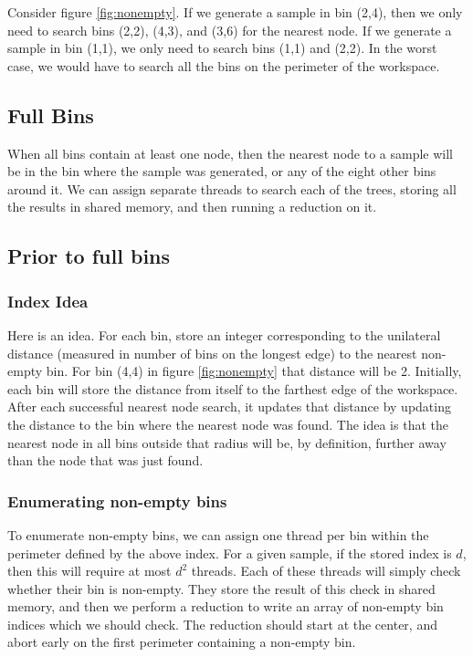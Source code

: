 Consider figure \ref{fig:nonempty}. If we generate a sample in bin (2,4), then we only need to search bins (2,2), (4,3), and (3,6) for the nearest node. If we generate a sample in bin (1,1), we only need to search bins (1,1) and (2,2). In the worst case, we would have to search all the bins on the perimeter of the workspace. 

\subsection{Full Bins}

When all bins contain at least one node, then the nearest node to a sample will be in the bin where the sample was generated, or any of the eight other bins around it. We can assign separate threads to search each of the trees, storing all the results in shared memory, and then running a reduction on it. 

\subsection{Prior to full bins}

\subsubsection{Index Idea}

Here is an idea. For each bin, store an integer corresponding to the unilateral distance (measured in number of bins on the longest edge) to the nearest non-empty bin. For bin (4,4) in figure \ref{fig:nonempty} that distance will be 2. Initially, each bin will store the distance from itself to the farthest edge of the workspace. After each successful nearest node search, it updates that distance by updating the distance to the bin where the nearest node was found. The idea is that the nearest node in all bins outside that radius will be, by definition, further away than the node that was just found. 

\subsubsection{Enumerating non-empty bins}

To enumerate non-empty bins, we can assign one thread per bin within the perimeter defined by the above index. For a given sample, if the stored index is $d$, then this will require at most $d^2$ threads. Each of these threads will simply check whether their bin is non-empty. They store the result of this check in shared memory, and then we perform a reduction to write an array of non-empty bin indices which we should check. The reduction should start at the center, and abort early on the first perimeter containing
 a non-empty bin.


